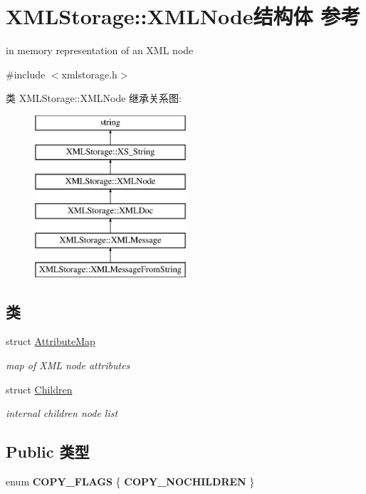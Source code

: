 \hypertarget{struct_x_m_l_storage_1_1_x_m_l_node}{}\section{X\+M\+L\+Storage\+:\+:X\+M\+L\+Node结构体 参考}
\label{struct_x_m_l_storage_1_1_x_m_l_node}


in memory representation of an X\+ML node  




{\ttfamily \#include $<$xmlstorage.\+h$>$}

类 X\+M\+L\+Storage\+:\+:X\+M\+L\+Node 继承关系图\+:\begin{figure}[H]
\begin{center}
\leavevmode
\includegraphics[height=6.000000cm]{struct_x_m_l_storage_1_1_x_m_l_node}
\end{center}
\end{figure}
\subsection*{类}
\begin{DoxyCompactItemize}
\item 
struct \hyperlink{struct_x_m_l_storage_1_1_x_m_l_node_1_1_attribute_map}{Attribute\+Map}
\begin{DoxyCompactList}\small\item\em map of X\+ML node attributes \end{DoxyCompactList}\item 
struct \hyperlink{struct_x_m_l_storage_1_1_x_m_l_node_1_1_children}{Children}
\begin{DoxyCompactList}\small\item\em internal children node list \end{DoxyCompactList}\end{DoxyCompactItemize}
\subsection*{Public 类型}
\begin{DoxyCompactItemize}
\item 
\mbox{\label{struct_x_m_l_storage_1_1_x_m_l_node_aa84037597ed74b408071b606d1dba592}} 
enum {\bfseries C\+O\+P\+Y\+\_\+\+F\+L\+A\+GS} \{ {\bfseries C\+O\+P\+Y\+\_\+\+N\+O\+C\+H\+I\+L\+D\+R\+EN}
 \}
\end{DoxyCompactItemize}
